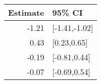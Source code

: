 \begin{tabular}{rl}
  \hline
Estimate & 95\% CI \\ 
  \hline
-1.21 & [-1.41,-1.02] \\ 
  0.43 & [0.23,0.65] \\ 
  -0.19 & [-0.81,0.44] \\ 
  -0.07 & [-0.69,0.54] \\ 
   \hline
\end{tabular}

